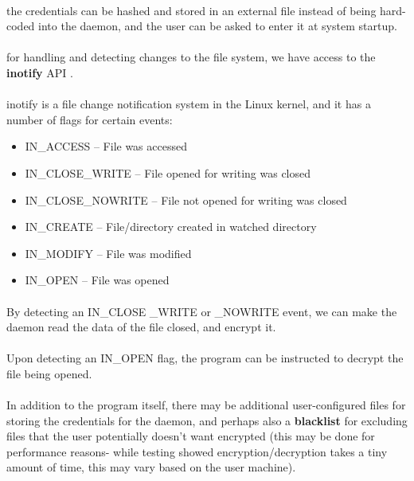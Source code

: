 \documentclass{article}
\begin{document}
    \paragraph{}the credentials can be hashed and stored in an external file instead of being hard-coded into the daemon, and the user can be asked to enter it at system startup.
    \paragraph{}for handling and detecting changes to the file system, we have access to the \textbf{inotify} API \parencite{inotify_manpage}.
    \paragraph{}inotify is a file change notification system in the Linux kernel, and it has a number of flags for certain events:
    \begin{itemize}
        \item IN\_ACCESS – File was accessed
        \item IN\_CLOSE\_WRITE – File opened for writing was closed
        \item IN\_CLOSE\_NOWRITE – File not opened for writing was closed
        \item IN\_CREATE – File/directory created in watched directory
        \item IN\_MODIFY – File was modified
        \item IN\_OPEN – File was opened
    \end{itemize}
    \paragraph{}By detecting an IN\_CLOSE \_WRITE or \_NOWRITE event, we can make the daemon read the data of the file closed, and encrypt it.
    \paragraph{}Upon detecting an IN\_OPEN flag, the program can be instructed to decrypt the file being opened.
    \paragraph{}In addition to the program itself, there may be additional user-configured files for storing the credentials for the daemon, and perhaps also a \textbf{blacklist} for excluding files that the user potentially doesn't want encrypted (this may be done for performance reasons- while testing showed encryption/decryption takes a tiny amount of time, this may vary based on the user machine).
\end{document}
